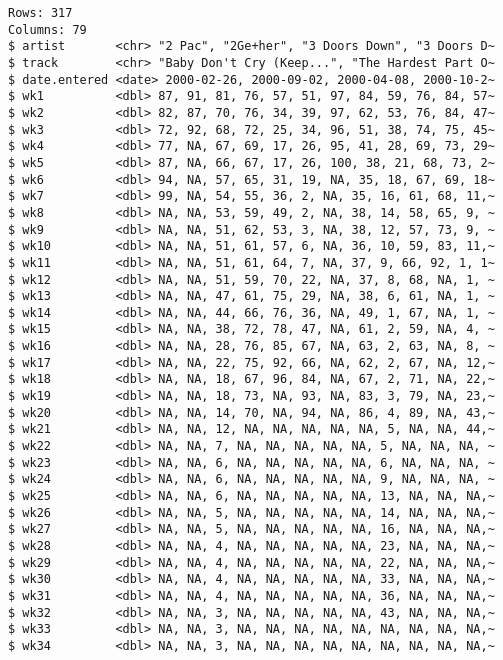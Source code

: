 \documentclass[
  letterpaper,
  DIV=11,
  numbers=noendperiod]{scrreprt}
\begin{document}
\begin{itemize}
\begin{itemize}
\begin{verbatim}
Rows: 317
Columns: 79
$ artist       <chr> "2 Pac", "2Ge+her", "3 Doors Down", "3 Doors D~
$ track        <chr> "Baby Don't Cry (Keep...", "The Hardest Part O~
$ date.entered <date> 2000-02-26, 2000-09-02, 2000-04-08, 2000-10-2~
$ wk1          <dbl> 87, 91, 81, 76, 57, 51, 97, 84, 59, 76, 84, 57~
$ wk2          <dbl> 82, 87, 70, 76, 34, 39, 97, 62, 53, 76, 84, 47~
$ wk3          <dbl> 72, 92, 68, 72, 25, 34, 96, 51, 38, 74, 75, 45~
$ wk4          <dbl> 77, NA, 67, 69, 17, 26, 95, 41, 28, 69, 73, 29~
$ wk5          <dbl> 87, NA, 66, 67, 17, 26, 100, 38, 21, 68, 73, 2~
$ wk6          <dbl> 94, NA, 57, 65, 31, 19, NA, 35, 18, 67, 69, 18~
$ wk7          <dbl> 99, NA, 54, 55, 36, 2, NA, 35, 16, 61, 68, 11,~
$ wk8          <dbl> NA, NA, 53, 59, 49, 2, NA, 38, 14, 58, 65, 9, ~
$ wk9          <dbl> NA, NA, 51, 62, 53, 3, NA, 38, 12, 57, 73, 9, ~
$ wk10         <dbl> NA, NA, 51, 61, 57, 6, NA, 36, 10, 59, 83, 11,~
$ wk11         <dbl> NA, NA, 51, 61, 64, 7, NA, 37, 9, 66, 92, 1, 1~
$ wk12         <dbl> NA, NA, 51, 59, 70, 22, NA, 37, 8, 68, NA, 1, ~
$ wk13         <dbl> NA, NA, 47, 61, 75, 29, NA, 38, 6, 61, NA, 1, ~
$ wk14         <dbl> NA, NA, 44, 66, 76, 36, NA, 49, 1, 67, NA, 1, ~
$ wk15         <dbl> NA, NA, 38, 72, 78, 47, NA, 61, 2, 59, NA, 4, ~
$ wk16         <dbl> NA, NA, 28, 76, 85, 67, NA, 63, 2, 63, NA, 8, ~
$ wk17         <dbl> NA, NA, 22, 75, 92, 66, NA, 62, 2, 67, NA, 12,~
$ wk18         <dbl> NA, NA, 18, 67, 96, 84, NA, 67, 2, 71, NA, 22,~
$ wk19         <dbl> NA, NA, 18, 73, NA, 93, NA, 83, 3, 79, NA, 23,~
$ wk20         <dbl> NA, NA, 14, 70, NA, 94, NA, 86, 4, 89, NA, 43,~
$ wk21         <dbl> NA, NA, 12, NA, NA, NA, NA, NA, 5, NA, NA, 44,~
$ wk22         <dbl> NA, NA, 7, NA, NA, NA, NA, NA, 5, NA, NA, NA, ~
$ wk23         <dbl> NA, NA, 6, NA, NA, NA, NA, NA, 6, NA, NA, NA, ~
$ wk24         <dbl> NA, NA, 6, NA, NA, NA, NA, NA, 9, NA, NA, NA, ~
$ wk25         <dbl> NA, NA, 6, NA, NA, NA, NA, NA, 13, NA, NA, NA,~
$ wk26         <dbl> NA, NA, 5, NA, NA, NA, NA, NA, 14, NA, NA, NA,~
$ wk27         <dbl> NA, NA, 5, NA, NA, NA, NA, NA, 16, NA, NA, NA,~
$ wk28         <dbl> NA, NA, 4, NA, NA, NA, NA, NA, 23, NA, NA, NA,~
$ wk29         <dbl> NA, NA, 4, NA, NA, NA, NA, NA, 22, NA, NA, NA,~
$ wk30         <dbl> NA, NA, 4, NA, NA, NA, NA, NA, 33, NA, NA, NA,~
$ wk31         <dbl> NA, NA, 4, NA, NA, NA, NA, NA, 36, NA, NA, NA,~
$ wk32         <dbl> NA, NA, 3, NA, NA, NA, NA, NA, 43, NA, NA, NA,~
$ wk33         <dbl> NA, NA, 3, NA, NA, NA, NA, NA, NA, NA, NA, NA,~
$ wk34         <dbl> NA, NA, 3, NA, NA, NA, NA, NA, NA, NA, NA, NA,~

\end{verbatim}
\end{itemize}
\end{itemize}
\end{document}
